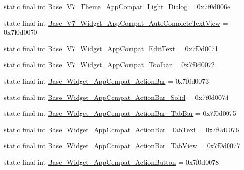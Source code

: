 \begin{DoxyCompactItemize}
\item 
static final int \mbox{\hyperlink{classandroid_1_1support_1_1v7_1_1appcompat_1_1R_1_1style_a08bfd257261eced92485a6a577209bcf}{Base\+\_\+\+V7\+\_\+\+Theme\+\_\+\+App\+Compat\+\_\+\+Light\+\_\+\+Dialog}} = 0x7f0d006e
\item 
static final int \mbox{\hyperlink{classandroid_1_1support_1_1v7_1_1appcompat_1_1R_1_1style_a341274b28a1791a4d4de468f2937e268}{Base\+\_\+\+V7\+\_\+\+Widget\+\_\+\+App\+Compat\+\_\+\+Auto\+Complete\+Text\+View}} = 0x7f0d0070
\item 
static final int \mbox{\hyperlink{classandroid_1_1support_1_1v7_1_1appcompat_1_1R_1_1style_ae17c6169562b437797c8ae9b247ef322}{Base\+\_\+\+V7\+\_\+\+Widget\+\_\+\+App\+Compat\+\_\+\+Edit\+Text}} = 0x7f0d0071
\item 
static final int \mbox{\hyperlink{classandroid_1_1support_1_1v7_1_1appcompat_1_1R_1_1style_a4d27eb93a5dd0384a99f8d4a3432d5d9}{Base\+\_\+\+V7\+\_\+\+Widget\+\_\+\+App\+Compat\+\_\+\+Toolbar}} = 0x7f0d0072
\item 
static final int \mbox{\hyperlink{classandroid_1_1support_1_1v7_1_1appcompat_1_1R_1_1style_a0bf1f7f1e1772ee2c55dc270ab6c9c13}{Base\+\_\+\+Widget\+\_\+\+App\+Compat\+\_\+\+Action\+Bar}} = 0x7f0d0073
\item 
static final int \mbox{\hyperlink{classandroid_1_1support_1_1v7_1_1appcompat_1_1R_1_1style_a78e5768624be8e6fef216b3d4292c06d}{Base\+\_\+\+Widget\+\_\+\+App\+Compat\+\_\+\+Action\+Bar\+\_\+\+Solid}} = 0x7f0d0074
\item 
static final int \mbox{\hyperlink{classandroid_1_1support_1_1v7_1_1appcompat_1_1R_1_1style_aeadd677d9db8698be561b80a977d6d06}{Base\+\_\+\+Widget\+\_\+\+App\+Compat\+\_\+\+Action\+Bar\+\_\+\+Tab\+Bar}} = 0x7f0d0075
\item 
static final int \mbox{\hyperlink{classandroid_1_1support_1_1v7_1_1appcompat_1_1R_1_1style_aaca3832573f385e5f197da3a0e9c5571}{Base\+\_\+\+Widget\+\_\+\+App\+Compat\+\_\+\+Action\+Bar\+\_\+\+Tab\+Text}} = 0x7f0d0076
\item 
static final int \mbox{\hyperlink{classandroid_1_1support_1_1v7_1_1appcompat_1_1R_1_1style_acc9a184f5947dff276d83a0e0c52f9cf}{Base\+\_\+\+Widget\+\_\+\+App\+Compat\+\_\+\+Action\+Bar\+\_\+\+Tab\+View}} = 0x7f0d0077
\item 
static final int \mbox{\hyperlink{classandroid_1_1support_1_1v7_1_1appcompat_1_1R_1_1style_acbbde3a0af3ff2fec800b3cf26b6cb43}{Base\+\_\+\+Widget\+\_\+\+App\+Compat\+\_\+\+Action\+Button}} = 0x7f0d0078
\item 

\end{DoxyCompactItemize}
